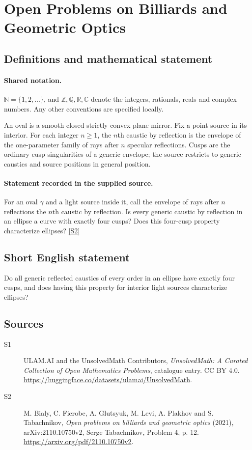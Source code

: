 \documentclass[11pt]{article}
\newcommand{\sref}[2]{\hyperlink{source:#1:#2}{[S#2]}}
\begin{document}
\section{Open Problems on Billiards and Geometric Optics}\label{statement}

\subsection{Definitions and mathematical statement}

\paragraph{Shared notation.}$\mathbb N=\{1,2,\ldots\}$, and $\mathbb Z,\mathbb Q,\mathbb R,\mathbb C$ denote the integers, rationals, reals and complex numbers. Any other conventions are specified locally.


An oval is a smooth closed strictly convex plane mirror. Fix a point source in its interior. For each integer $n\ge1$, the $n$th caustic by reflection is the envelope of the one-parameter family of rays after $n$ specular reflections. Cusps are the ordinary cusp singularities of a generic envelope; the source restricts to generic caustics and source positions in general position.
\paragraph{Statement recorded in the supplied source.}
For an oval $\gamma$ and a light source inside it, call the envelope of rays after $n$ reflections the $n$th caustic by reflection. Is every generic caustic by reflection in an ellipse a curve with exactly four cusps? Does this four-cusp property characterize ellipses? \sref{statement}{2}
\subsection{Short English statement}
Do all generic reflected caustics of every order in an ellipse have exactly four cusps, and does having this property for interior light sources characterize ellipses?
\subsection{Sources}
\begin{description}
\item[\hypertarget{source:statement:1}{S1}] ULAM.AI and the UnsolvedMath Contributors, \emph{UnsolvedMath: A Curated Collection of Open Mathematics Problems}, catalogue entry. CC BY 4.0. \url{https://huggingface.co/datasets/ulamai/UnsolvedMath}.
\item[\hypertarget{source:statement:2}{S2}] M. Bialy, C. Fierobe, A. Glutsyuk, M. Levi, A. Plakhov and S. Tabachnikov, \emph{Open problems on billiards and geometric optics} (2021), arXiv:2110.10750v2, Serge Tabachnikov, Problem 4, p. 12. \url{https://arxiv.org/pdf/2110.10750v2}.
\end{description}
\label{end:statement}
\end{document}
